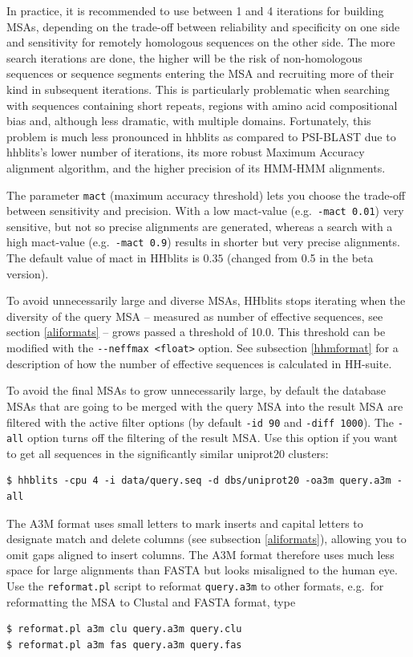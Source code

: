 \documentclass[11pt,a4paper]{article}
\begin{document}
In practice, it is recommended to use between 1 and 4 iterations for building MSAs, depending on the trade-off between reliability and specificity on one side and sensitivity for remotely homologous sequences on the other side. The more search iterations are done, the higher will be the risk of non-homologous sequences or sequence segments entering the MSA and recruiting more of their kind in subsequent iterations. This is particularly problematic when searching with sequences containing short repeats, regions with amino acid compositional bias and, although less dramatic,  with multiple domains. Fortunately, this problem is much less pronounced in hhblits as compared to PSI-BLAST due to hhblits's lower number of iterations, its more robust Maximum Accuracy alignment algorithm, and the higher precision of its HMM-HMM alignments. 

The parameter \verb`mact` (maximum accuracy threshold) lets you choose the trade-off between sensitivity and 
precision. With a low mact-value (e.g.\ \verb`-mact 0.01`) very sensitive, but not 
so precise alignments are generated, whereas a search with a high mact-value (e.g.\ \verb`-mact 0.9`) 
results in shorter but very precise alignments. The default value of mact in HHblits is $0.35$ 
(changed from 0.5 in the beta version). 

To avoid unnecessarily large and diverse MSAs, HHblits stops iterating when the diversity of the query MSA -- measured as number of effective sequences, see section \ref{aliformats} -- grows passed a threshold of 10.0. This threshold can be modified with the \verb`--neffmax <float>` option. See subsection \ref{hhmformat} for a description of how the number of effective sequences is calculated in HH-suite.

To avoid the final MSAs to grow unnecessarily large, by default the database MSAs that are going to be merged with the query MSA into the result MSA are filtered with the active filter options (by default \verb`-id 90` and \verb`-diff 1000`). The \verb`-all` option turns off the filtering of the result MSA. Use this option if you want to get all sequences in the significantly similar uniprot20 clusters: 
\begin{verbatim}
$ hhblits -cpu 4 -i data/query.seq -d dbs/uniprot20 -oa3m query.a3m -all
\end{verbatim}

The A3M format uses small letters to mark inserts and capital letters to designate match and delete columns (see subsection \ref{aliformats}), allowing you to omit gaps aligned to insert columns. The A3M format therefore uses much less space for large alignments than FASTA but looks misaligned to the human eye. Use the \verb`reformat.pl` script to reformat \verb`query.a3m` to other formats, e.g.\ for reformatting the MSA to Clustal and FASTA format, type
\begin{verbatim}
$ reformat.pl a3m clu query.a3m query.clu
$ reformat.pl a3m fas query.a3m query.fas
\end{verbatim}
\end{document}
